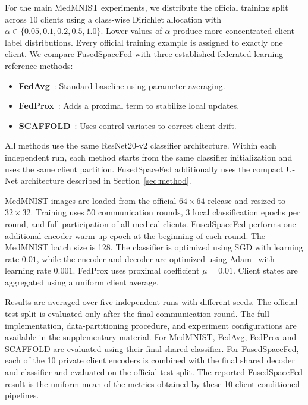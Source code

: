 \documentclass[twoside]{article}
\theoremstyle{thmstyleone}%
\theoremstyle{thmstyletwo}%
\theoremstyle{thmstylethree}%
\begin{document}
For the main MedMNIST experiments, we distribute the official training split
across 10 clients using a class-wise Dirichlet allocation with
$\alpha\in\{0.05,0.1,0.2,0.5,1.0\}$. Lower values of $\alpha$ produce more
concentrated client label distributions. Every official training example is
assigned to exactly one client.
We compare FusedSpaceFed with three established federated learning reference methods:
\begin{itemize}
\item \textbf{FedAvg}~\cite{mcmahan2017communication}: Standard baseline using parameter averaging.
\item \textbf{FedProx}~\cite{li2018federated}: Adds a proximal term to stabilize local updates.
\item \textbf{SCAFFOLD}~\cite{karimireddy2020scaffold}: Uses control variates to correct client drift.
\end{itemize}

All methods use the same ResNet20-v2 classifier architecture. Within each
independent run, each method starts from the
same classifier initialization and uses the same client partition. FusedSpaceFed
additionally uses the compact U-Net architecture described in
Section~\ref{sec:method}.

MedMNIST images are loaded from the official $64\times64$ release and resized
to $32\times32$. Training uses 50 communication rounds, 3 local classification
epochs per round, and full participation of all medical clients.
FusedSpaceFed performs one additional encoder warm-up epoch at the beginning of
each round. The MedMNIST batch size is 128. The classifier is optimized using
SGD with learning rate $0.01$, while the encoder and decoder are optimized
using Adam~\cite{kingma2015adam} with learning rate $0.001$. FedProx uses proximal coefficient
$\mu=0.01$. Client states are aggregated using a uniform client average.

Results are averaged over five independent runs with different seeds. The official test split is evaluated only after the
final communication round. The full implementation, data-partitioning procedure, and experiment configurations are available in the supplementary material.
For MedMNIST, FedAvg, FedProx and SCAFFOLD are evaluated using their final
shared classifier. For FusedSpaceFed, each of the 10 private client encoders is
combined with the final shared decoder and classifier and evaluated on the
official test split. The reported FusedSpaceFed result is the uniform mean of
the metrics obtained by these 10 client-conditioned pipelines.
\end{document}
